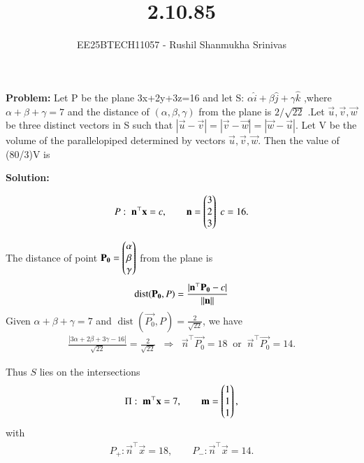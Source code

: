 \documentclass[journal]{IEEEtran}
\begin{document}




\title{2.10.85}
\author{EE25BTECH11057 - Rushil Shanmukha Srinivas
}
{\let\newpage\relax\maketitle}

\renewcommand{\thefigure}{\theenumi}
\renewcommand{\thetable}{\theenumi}
\setlength{\intextsep}{10pt} %

\renewcommand{\thetable}{\theenumi}



\textbf{Problem:} Let P be the plane 3x+2y+3z=16 and let S: $\alpha\hat{i} + \beta\hat{j} + \gamma\hat{k} $ ,where $\alpha+\beta+\gamma=7$ and the distance of $(\alpha,\beta,\gamma)$ from the plane is $2/{\sqrt{22}}$ .Let $\vec{u},\vec{v},\vec{w}$ be three distinct vectors in S such that $|\vec{u}-\vec{v}|=|\vec{v}-\vec{w}|=|\vec{w}-\vec{u}|$. Let V be the volume of the parallelopiped determined by vectors $\vec{u},\vec{v},\vec{w}$. Then the value of (80/3)V is 

\textbf{Solution:}

\begin{align}
P:\; \mathbf{n}^\top \mathbf{x} = c,\qquad \mathbf{n}=\begin{pmatrix}3\\2\\3\end{pmatrix}\;c=16.
\end{align}

The distance of point $\mathbf{P_0}=\begin{pmatrix}\alpha\\ \beta\\ \gamma\end{pmatrix}$ from the plane is
\begin{align}
\operatorname{dist}(\mathbf{P_0},P)=\frac{|\mathbf{n}^\top \mathbf{P_0} - c|}{\left\lVert\mathbf{n}\right\rVert}
\end{align}
Given $\alpha+\beta+\gamma=7$ and $\operatorname{dist}(\vec{P_0},P)=\tfrac{2}{\sqrt{22}}$, we have
\begin{align}
\frac{|3\alpha+2\beta+3\gamma-16|}{\sqrt{22}}=\frac{2}{\sqrt{22}}
\;\;\Longrightarrow\;\; \vec{n}^\top \vec{P_0}=18 \;\;\text{or}\;\; \vec{n}^\top \vec{P_0}=14.
\end{align}

Thus $S$ lies on the intersections
\begin{align}
\Pi:\; \mathbf{m}^\top \mathbf{x}=7,\qquad \mathbf{m}=\begin{pmatrix}1\\1\\1\end{pmatrix},
\end{align}
with
\begin{align}
P_+: \vec{n}^\top \vec{x}=18,\qquad P_-:\vec{n}^\top \vec{x}=14.
\end{align}
\end{document}
